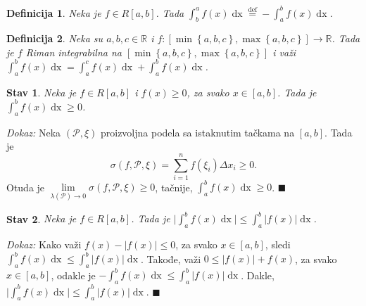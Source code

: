 \documentclass{article}
\newtheorem{definicija}{Definicija}[section]
\newtheorem{stav}{Stav}[section]
\DeclareMathOperator{\dx}{dx}
\begin{document}
\begin{defbox}
    \label{definicija_2.11}
    \begin{definicija}
        Neka je $f \in R\left[a, b\right]$. Tada $\displaystyle\int^a_b f\left(x\right)\dx \overset{\text{def}}{=} -\int^b_a f\left(x\right)\dx$.
    \end{definicija}
\end{defbox}

\begin{defbox}
    \label{definicija_2.12}
    \begin{definicija} Neka su $a, b, c \in \mathbb{R}$ i $f:\left[\min\left\{a, b, c\right\}, \max\left\{a, b, c\right\}\right] \longrightarrow \mathbb{R}$. Tada je
        $f$ Riman integrabilna na $\left[\min\left\{a, b, c\right\}, \max\left\{a, b, c\right\}\right]$ i važi
        $\displaystyle \int^b_a f\left(x\right)\dx = \int^c_a f\left(x\right)\dx + \int^b_a f\left(x\right) \dx$.
    \end{definicija}
\end{defbox}

\begin{stavbox}
    \label{stav_2.8}
    \begin{stav}
        Neka je $f \in R\left[a,b\right]$ i $f\left(x\right) \geq 0$, za svako $x \in \left[a,b\right]$. Tada je $\displaystyle \int^b_a f\left(x\right)\dx \geq 0$.
    \end{stav}
\end{stavbox}

\textit{Dokaz:} Neka $\left(\mathcal{P}, \xi\right)$ proizvoljna podela sa istaknutim tačkama na
$\left[a, b\right]$. Tada je
$$\sigma\left(f, \mathcal{P}, \xi\right) = \displaystyle \sum^n_{i=1}f\left(\xi_i\right)\Delta x_i \geq 0.$$
Otuda je $\displaystyle \lim\limits_{\lambda\left(\mathcal{P}\right)\longrightarrow 0} \sigma \left(f, \mathcal{P}, \xi\right) \geq 0$, tačnije, $\displaystyle \int^b_a f\left(x\right)\dx \geq 0$.
\null\hfill $\blacksquare$\par

\begin{stavbox}
    \label{stav_2.9}
    \begin{stav}
        Neka je $f \in R\left[a, b\right]$. Tada je $\displaystyle \bigg|\int^b_a f\left(x\right)\dx\bigg| \leq \int^b_a\big|f\left(x\right)\big|\dx$.
    \end{stav}
\end{stavbox}

\textit{Dokaz:} Kako važi $f\left(x\right) - |f\left(x\right)| \leq 0$, za svako $x\in \left[a, b\right]$, sledi $\displaystyle \int^b_a f\left(x\right)\dx \leq \int^b_a |f\left(x\right)|\dx$.
Takođe, važi $0\leq|f\left(x\right)| + f\left(x\right)$, za svako $x\in \left[a, b\right]$, odakle je $\displaystyle -\int^b_a f\left(x\right)\dx \leq \int^b_a |f\left(x\right)|\dx$.
Dakle, $\displaystyle \bigg|\int^b_a f\left(x\right)\dx\bigg| \leq \int^b_a\big|f\left(x\right)\big|\dx$.
\null\hfill $\blacksquare$\par
\end{document}
